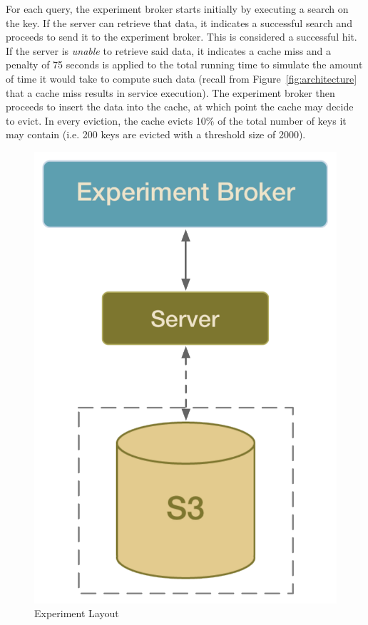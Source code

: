 For each query, the experiment broker starts initially by executing a search on
the key. If the server can retrieve that data, it indicates a successful search
and proceeds to send it to the experiment broker. This is considered a
successful hit. If the server is \emph{unable} to retrieve said data, it
indicates a cache miss and a penalty of 75 seconds is applied to the total
running time to simulate the amount of time it would take to compute such data
(recall from Figure~\ref{fig:architecture} that a cache miss results in service
execution). The experiment broker then proceeds to insert the data into the
cache, at which point the cache may decide to evict. In every eviction, the
cache evicts 10\% of the total number of keys it may contain (i.e. 200 keys are
evicted with a threshold size of 2000).

\begin{figure}[htp]
\begin{center}
\includegraphics[scale=0.4]{figures/experiment_setup.pdf}
\end{center}
\caption{Experiment Layout}
\label{fig:experiment_layout}
\end{figure}

